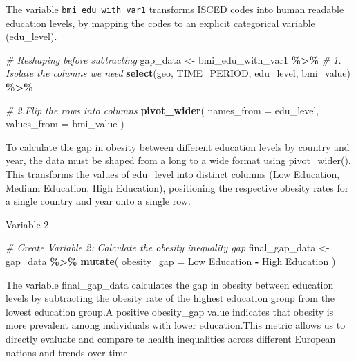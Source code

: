 \documentclass[
]{article}
\newenvironment{Shaded}{\begin{snugshade}}{\end{snugshade}}
\newcommand{\AttributeTok}[1]{\textcolor[rgb]{0.13,0.29,0.53}{#1}}
\newcommand{\CommentTok}[1]{\textcolor[rgb]{0.56,0.35,0.01}{\textit{#1}}}
\newcommand{\FunctionTok}[1]{\textcolor[rgb]{0.13,0.29,0.53}{\textbf{#1}}}
\newcommand{\NormalTok}[1]{#1}
\newcommand{\OtherTok}[1]{\textcolor[rgb]{0.56,0.35,0.01}{#1}}
\newcommand{\SpecialCharTok}[1]{\textcolor[rgb]{0.81,0.36,0.00}{\textbf{#1}}}
\newcommand{\StringTok}[1]{\textcolor[rgb]{0.31,0.60,0.02}{#1}}
\begin{document}
The variable \texttt{bmi\_edu\_with\_var1} transforms ISCED codes into
human readable education levels, by mapping the codes to an explicit
categorical variable (edu\_level).

\begin{Shaded}
\begin{Highlighting}[]
\CommentTok{\# Reshaping before subtracting}
\NormalTok{gap\_data }\OtherTok{\textless{}{-}}\NormalTok{ bmi\_edu\_with\_var1 }\SpecialCharTok{\%\textgreater{}\%}
  \CommentTok{\# 1. Isolate the columns we need}
  \FunctionTok{select}\NormalTok{(geo, TIME\_PERIOD, edu\_level, bmi\_value) }\SpecialCharTok{\%\textgreater{}\%}
  
  \CommentTok{\# 2.Flip the rows into columns}
  \FunctionTok{pivot\_wider}\NormalTok{(}
    \AttributeTok{names\_from =}\NormalTok{ edu\_level, }
    \AttributeTok{values\_from =}\NormalTok{ bmi\_value}
\NormalTok{  )}
\end{Highlighting}
\end{Shaded}

To calculate the gap in obesity between different education levels by
country and year, the data must be shaped from a long to a wide format
using pivot\_wider(). This transforms the values of edu\_level into
distinct columns (Low Education, Medium Education, High Education),
positioning the respective obesity rates for a single country and year
onto a single row.

Variable 2

\begin{Shaded}
\begin{Highlighting}[]

\CommentTok{\# Create Variable 2: Calculate the obesity inequality gap}
\NormalTok{final\_gap\_data }\OtherTok{\textless{}{-}}\NormalTok{ gap\_data }\SpecialCharTok{\%\textgreater{}\%}
  \FunctionTok{mutate}\NormalTok{(}
    \AttributeTok{obesity\_gap =} \StringTok{\textasciigrave{}}\AttributeTok{Low Education}\StringTok{\textasciigrave{}} \SpecialCharTok{{-}} \StringTok{\textasciigrave{}}\AttributeTok{High Education}\StringTok{\textasciigrave{}}
\NormalTok{  )}
\end{Highlighting}
\end{Shaded}

The variable final\_gap\_data calculates the gap in obesity between
education levels by subtracting the obesity rate of the highest
education group from the lowest education group.A positive obesity\_gap
value indicates that obesity is more prevalent among individuals with
lower education.This metric allows us to directly evaluate and compare
te health inequalities across different European nations and trends over
time.
\end{document}
